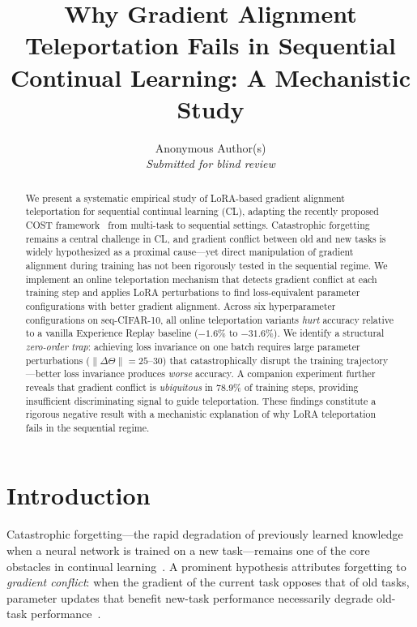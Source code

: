 \documentclass[11pt,a4paper]{article}
\title{\textbf{Why Gradient Alignment Teleportation Fails in Sequential\\
       Continual Learning: A Mechanistic Study}}
\author{Anonymous Author(s) \\ \textit{Submitted for blind review}}
\date{}
\begin{document}
\maketitle
\thispagestyle{empty}

\begin{abstract}
We present a systematic empirical study of LoRA-based gradient alignment teleportation
for sequential continual learning (CL), adapting the recently proposed COST
framework~\citep{zhou2025cost} from multi-task to sequential settings.
Catastrophic forgetting remains a central challenge in CL, and gradient conflict between
old and new tasks is widely hypothesized as a proximal cause---yet direct manipulation
of gradient alignment during training has not been rigorously tested in the sequential regime.
We implement an online teleportation mechanism that detects gradient conflict at each
training step and applies LoRA perturbations to find loss-equivalent parameter configurations
with better gradient alignment.
Across six hyperparameter configurations on seq-CIFAR-10, all online teleportation variants
\emph{hurt} accuracy relative to a vanilla Experience Replay baseline ($-1.6\%$ to $-31.6\%$).
We identify a structural \emph{zero-order trap}: achieving loss invariance on one batch
requires large parameter perturbations ($\|\Delta\Theta\| = 25$--$30$) that catastrophically
disrupt the training trajectory---better loss invariance produces \emph{worse} accuracy.
A companion experiment further reveals that gradient conflict is \emph{ubiquitous} in 78.9\%
of training steps, providing insufficient discriminating signal to guide teleportation.
These findings constitute a rigorous negative result with a mechanistic explanation
of why LoRA teleportation fails in the sequential regime.
\end{abstract}

\section{Introduction}
\label{sec:intro}

Catastrophic forgetting---the rapid degradation of previously learned knowledge when a
neural network is trained on a new task---remains one of the core obstacles in continual
learning~\citep{kirkpatrick2017ewc, vandeven2022survey}.
A prominent hypothesis attributes forgetting to \emph{gradient conflict}: when the gradient
of the current task opposes that of old tasks, parameter updates that benefit new-task
performance necessarily degrade old-task performance~\citep{lopezpaz2017gem, yu2020pcgrad}.
\end{document}
